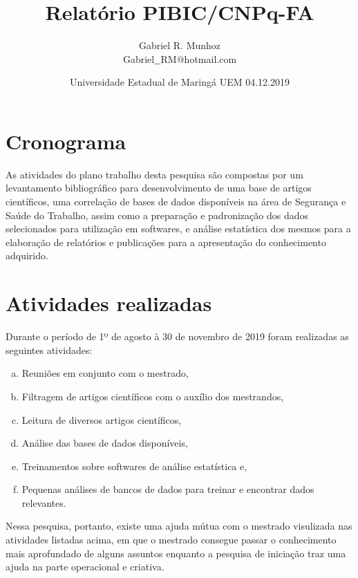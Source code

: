 \documentclass{article}
\title{Relatório PIBIC/CNPq-FA} %
\author{Gabriel R. Munhoz\\ Gabriel$\_\_$RM$@$hotmail.com} %
\date{Universidade Estadual de Maringá UEM 04.12.2019} %
\begin{document}
\maketitle %



\section*{Cronograma} %

As atividades do plano trabalho desta pesquisa são compostas por um levantamento bibliográfico para desenvolvimento de uma base de artigos científicos, uma correlação de bases de dados disponíveis na área de Segurança e Saúde do Trabalho, assim como a preparação e padronização dos dados selecionados para utilização em softwares, e análise estatística dos mesmos para a elaboração de relatórios e publicações para a apresentação do conhecimento adquirido.


\section{Atividades realizadas} %

Durante o período de 1º de agosto à 30 de novembro de 2019 foram realizadas as seguintes atividades: 
\begin{enumerate}[a)]

\item Reuniões em conjunto com o mestrado, 
\item Filtragem de artigos científicos com o auxílio dos mestrandos, 
\item Leitura de diversos artigos científicos,
\item Análise das bases de dados disponíveis,
\item Treinamentos sobre softwares de análise estatística e,
\item Pequenas análises de bancos de dados para treinar e encontrar dados relevantes.

\end{enumerate}

Nessa pesquisa, portanto, existe uma ajuda mútua com o mestrado visulizada nas atividades listadas acima, em que o mestrado consegue passar o conhecimento mais aprofundado de alguns assuntos enquanto a pesquisa de iniciação traz uma ajuda na parte operacional e criativa.
\end{document}

